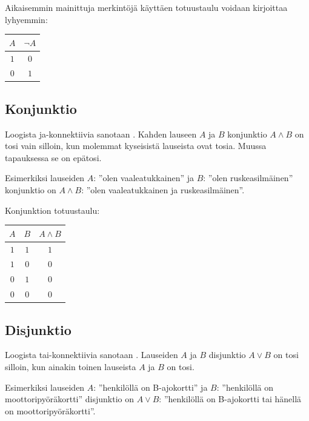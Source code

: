 \bigskip

Aikaisemmin mainittuja merkintöjä käyttäen totuustaulu voidaan kirjoittaa lyhyemmin:

\bigskip

\begin{center}
\begin{tabular}{|c|c|}\hline
$A$ & $\lnot A$ \\ \hline
$1$ & $0$\\ 
$0$ & $1$ \\ \hline
\end{tabular}
\end{center}

\bigskip

\subsection*{Konjunktio}
Loogista ja-konnektiivia sanotaan . Kahden lauseen $A$ ja $B$ konjunktio $A\land B$ on tosi vain silloin, kun molemmat kyseisistä lauseista ovat tosia. Muussa tapauksessa se on epätosi.

Esimerkiksi lauseiden $A$: ''olen vaaleatukkainen'' ja $B$: ''olen ruskeasilmäinen'' konjunktio on $A \land B$: ''olen vaaleatukkainen ja ruskeasilmäinen''. 

Konjunktion totuustaulu:

\bigskip

\begin{center}
\begin{tabular}{|c|c|c|}\hline
$A$ & $B$ & $A\land B$ \\ \hline
$1$ & $1$ & $1$\\ 
$1$ & $0$ & $0$\\
$0$ & $1$ & $0$\\
$0$ & $0$ & $0$\\
\hline
\end{tabular}
\end{center}

\bigskip

\subsection*{Disjunktio} Loogista tai-konnektiivia sanotaan . Lauseiden $A$ ja $B$ disjunktio $A\lor B$ on tosi silloin, kun ainakin toinen lauseista $A$ ja $B$ on tosi.


Esimerkiksi lauseiden $A$: ''henkilöllä on B-ajokortti'' ja $B$: ''henkilöllä on moottoripyöräkortti'' disjunktio on $A \lor B$: ''henkilöllä on B-ajokortti tai hänellä on moottoripyöräkortti''. 

